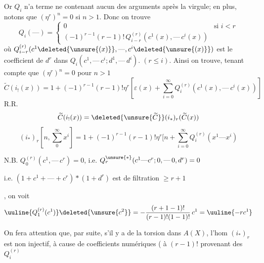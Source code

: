 Or $Q_i$ n'a  terme ne contenant aucun des arguments après la virgule;
en plus, notons que $(\eta^r)^n=0$ si $n>1$. Donc on trouve
\[
Q_i(\text{---})=\begin{cases}
0&\text{si }i<r\\
(-1)^{r-1}(r-1)!\,Q_{i-r}^{(r)}(c^1(x),\text{---}\,c^i(x))
\end{cases}
\]
où $Q_{i-r}^{(r)}(c^1\deleted{\unsure{(x)}},\text{---},c^i\deleted{\unsure{(x)}})$
est le coefficient de $d^r$ dans $Q_i(c^1,\text{---}\,c^i;d^1,\text{---}\,d^i)$.
$(r\leq i)$.
Ainsi on trouve, tenant compte que $(\eta^r)^n=0$ pour $n>1$
\[
\widetilde C(i_!(x))=1+(-1)^{r-1}(r-1)!\eta^r
\left[\varepsilon(x)+\sum_{i=0}^\infty Q_i^{(r)}(c^1(x),\text{---}\,c^i(x))\right]
\]
  R.R.
\[
\widetilde C(i_!(x))=\deleted{\unsure{\widetilde C}}(i_*)_r(\widetilde C(x))
\]
 
\[
(i_*)_r\left[n,\sum_0^\infty x^i\right]
=1+(-1)^{r-1}(r-1)!\eta^r\biggl[n+\sum_{i=0}^\infty Q_i^{(r)}(x^1\text{---}x^i)
\]

N.B. $Q_0^{(r)}(c^1,\text{---}\,c^r)=0$, i.e.
$Q_r^{\unsure{*}}(c^1\text{---}c^r;0,\text{---}\,0,d^r)=0$

i.e. $(1+c^1+\text{---}+c^r)*(1+d^r)$ est de filtration $\geq r+1$

, on voit
\[
\uuline{Q_1^{(r)}(c^1)}\deleted{\unsure{c^2}}
=-\frac{(r+1-1)!}{(r-1)!(1-1)!}\,c^1=\uuline{-rc^1}
\]

On fera attention que, par suite, s'il y a de la torsion dans $A(X)$,
l'hom $(i_*)_r$ est non injectif, à cause de  coefficients numériques
( à $(r-1)!$  provenant des $Q_i^{(r)}$

